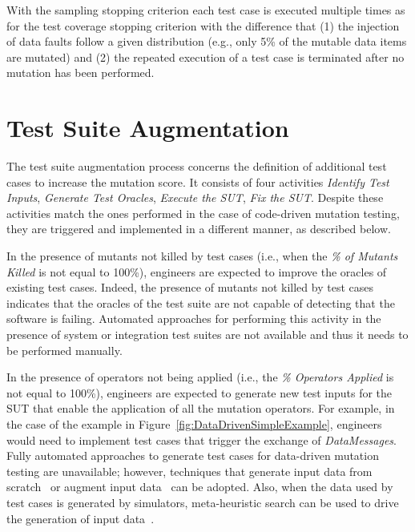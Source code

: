 With the sampling stopping criterion each test case is executed multiple times as for the test coverage stopping criterion with the difference that (1) the injection of data faults follow a given distribution (e.g., only 5\% of the mutable data items are mutated) and (2) the repeated execution of a test case is terminated after no mutation has been performed.



\clearpage
\section{Test Suite Augmentation} %
\label{sec:data:test_suite_augmentation}

The test suite augmentation process concerns the definition of additional test cases to increase the mutation score.
It consists of four activities \emph{Identify Test Inputs}, \emph{Generate Test Oracles}, \emph{Execute the SUT}, \emph{Fix the SUT}. 
Despite these activities match the ones performed in the case of code-driven mutation testing, they are triggered and implemented in a different manner, as described below.




In the presence of mutants not killed by test cases (i.e., when the \emph{\% of Mutants Killed} is not equal to 100\%), engineers are expected to improve the oracles of existing test cases. Indeed, the presence of mutants not killed by test cases indicates that the oracles of the test suite are not capable of detecting that the software is failing. 
Automated approaches for performing this activity in the presence of system or integration test suites are not available and thus it needs to be performed manually.

In the presence of operators not being applied (i.e., the \emph{\% Operators Applied} is not equal to 100\%), engineers are expected to generate new test inputs for the SUT that enable the application of all the mutation operators. 
For example, in the case of the example in Figure~\ref{fig:DataDrivenSimpleExample}, engineers would need to implement test cases that trigger the exchange of \emph{DataMessages}.
Fully automated approaches to generate test cases for data-driven mutation testing are unavailable; however, techniques that generate input data from scratch~\cite{gligoric2010test} or augment input data~\cite{DiNardo:TOSEM:2017} can be adopted. 
Also, when the data used by test cases is generated by simulators, meta-heuristic search can be used to drive the generation of input data~\cite{Abdessalem:ICSE:2018}. 

